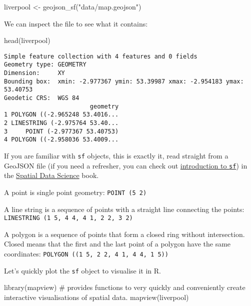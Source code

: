 \documentclass[
  letterpaper,
  DIV=11,
  numbers=noendperiod]{scrreprt}
\newenvironment{Shaded}{\begin{snugshade}}{\end{snugshade}}
\newcommand{\CommentTok}[1]{\textcolor[rgb]{0.37,0.37,0.37}{#1}}
\newcommand{\FunctionTok}[1]{\textcolor[rgb]{0.28,0.35,0.67}{#1}}
\newcommand{\NormalTok}[1]{\textcolor[rgb]{0.00,0.23,0.31}{#1}}
\newcommand{\OtherTok}[1]{\textcolor[rgb]{0.00,0.23,0.31}{#1}}
\newcommand{\StringTok}[1]{\textcolor[rgb]{0.13,0.47,0.30}{#1}}
\begin{document}
\begin{Shaded}
\begin{Highlighting}[]
\NormalTok{liverpool }\OtherTok{\textless{}{-}} \FunctionTok{geojson\_sf}\NormalTok{(}\StringTok{"data/map.geojson"}\NormalTok{)}
\end{Highlighting}
\end{Shaded}

We can inspect the file to see what it contains:

\begin{Shaded}
\begin{Highlighting}[]
\FunctionTok{head}\NormalTok{(liverpool)}
\end{Highlighting}
\end{Shaded}

\begin{verbatim}
Simple feature collection with 4 features and 0 fields
Geometry type: GEOMETRY
Dimension:     XY
Bounding box:  xmin: -2.977367 ymin: 53.39987 xmax: -2.954183 ymax: 53.40753
Geodetic CRS:  WGS 84
                        geometry
1 POLYGON ((-2.965248 53.4016...
2 LINESTRING (-2.975764 53.40...
3     POINT (-2.977367 53.40753)
4 POLYGON ((-2.958036 53.4009...
\end{verbatim}

If you are familiar with \texttt{sf} objects, this is exactly it, read
straight from a GeoJSON file (if you need a refresher, you can check out
\href{https://r-spatial.org/book/07-Introsf.html}{introduction to
\texttt{sf}}) in the \href{https://r-spatial.org/book/}{Spatial Data
Science} book.

 A point is single point geometry:
\texttt{POINT\ (5\ 2)}

 A line string is a sequence of points with a
straight line connecting the points:
\texttt{LINESTRING\ (1\ 5,\ 4\ 4,\ 4\ 1,\ 2\ 2,\ 3\ 2)}

 A polygon is a sequence of points that form a closed
ring without intersection. Closed means that the first and the last
point of a polygon have the same coordinates:
\texttt{POLYGON\ ((1\ 5,\ 2\ 2,\ 4\ 1,\ 4\ 4,\ 1\ 5))}

Let's quickly plot the \texttt{sf} object to visualise it in R.

\begin{Shaded}
\begin{Highlighting}[]
\FunctionTok{library}\NormalTok{(mapview) }\CommentTok{\# provides functions to very quickly and conveniently create interactive visualisations of spatial data.}
\FunctionTok{mapview}\NormalTok{(liverpool)}
\end{Highlighting}
\end{Shaded}
\end{document}
